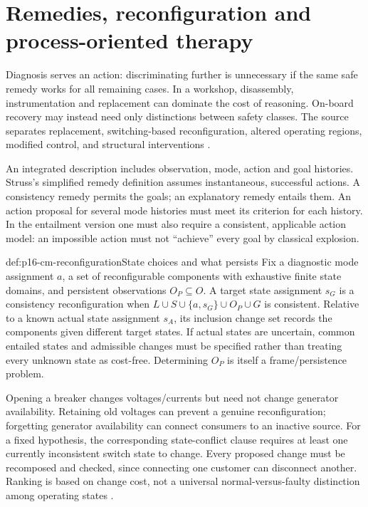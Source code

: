 \section{Remedies, reconfiguration and process-oriented therapy}
\label{sec:p16-cm-remedies}

Diagnosis serves an action: discriminating further is unnecessary if the
same safe remedy works for all remaining cases. In a workshop, disassembly,
instrumentation and replacement can dominate the cost of reasoning.
On-board recovery may instead need only distinctions between safety classes.
The source separates replacement, switching-based reconfiguration, altered
operating regions, modified control, and structural interventions
\cite[pp.~446--449]{Struss2008ModelBasedProblemSolving}.

An integrated description includes observation, mode, action and goal
histories. Struss's simplified remedy definition assumes instantaneous,
successful actions. A consistency remedy permits the goals; an explanatory
remedy entails them. An action proposal for several mode histories must
meet its criterion for each history. In the entailment version one must
also require a consistent, applicable action model: an impossible action
must not ``achieve'' every goal by classical explosion.

\begin{hbdefinition}{def:p16-cm-reconfiguration}{State choices and what persists}
Fix a diagnostic mode assignment \(a\), a set of reconfigurable
components with exhaustive finite state domains, and persistent observations
\(O_P\subseteq O\). A target state assignment \(s_G\) is a consistency
reconfiguration when \(L\cup S\cup\{a,s_G\}\cup O_P\cup G\)
is consistent. Relative to a known actual state assignment \(s_A\), its
inclusion change set records the components given different target states.
If actual states are uncertain, common entailed states and admissible changes
must be specified rather than treating every unknown state as cost-free.
Determining \(O_P\) is itself a frame/persistence problem.
\end{hbdefinition}

Opening a breaker changes voltages/currents but need not change generator
availability. Retaining old voltages can prevent a genuine reconfiguration;
forgetting generator availability can connect consumers to an inactive source.
For a fixed hypothesis, the corresponding state-conflict clause requires at
least one currently inconsistent switch state to change. Every proposed
change must be recomposed and checked, since connecting one customer can
disconnect another. Ranking is based on change cost, not a universal
normal-versus-faulty distinction among operating states
\cite[pp.~450--453]{Struss2008ModelBasedProblemSolving}.

